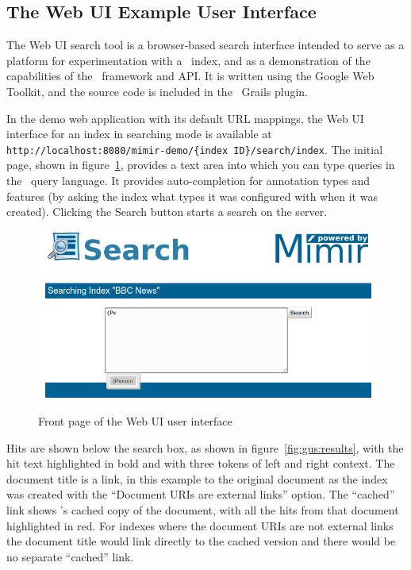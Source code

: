 \subsection{The Web UI Example User Interface}\label{sec:search:gus}

The Web UI search tool is a browser-based search interface intended to serve as
a platform for experimentation with a \Mimir\ index, and as a demonstration of
the capabilities of the \Mimir\ framework and API.  It is written using the
Google Web Toolkit, and the source code is included in the \Mimir\ Grails
plugin.

In the demo web application with its default URL mappings, the Web UI interface
for an index in searching mode is available at\\
\verb!http://localhost:8080/mimir-demo/{index ID}/search/index!.  The initial
page, shown in figure~\ref{fig:gus:front-page}, provides a text area into which
you can type queries in the \Mimir\ query language.  It provides
auto-completion for annotation types and features (by asking the index what
types it was configured with when it was created). Clicking the Search button
starts a search on the server.

\begin{figure}[tbp]
\begin{center}
\includegraphics[scale=0.5]{img/web-ui-frontpage}
\caption{Front page of the Web UI user interface}
\label{fig:gus:front-page}
\end{center}
\end{figure}

Hits are shown below the search box, as shown in figure~\ref{fig:gus:results},
with the hit text highlighted in bold and with three tokens of left and right
context.  The document title is a link, in this example to the original
document as the index was created with the ``Document URIs are external links''
option.  The ``cached'' link shows \Mimir's cached copy of the document, with
all the hits from that document highlighted in red.  For indexes where the
document URIs are not external links the document title would link directly to
the cached version and there would be no separate ``cached'' link.

